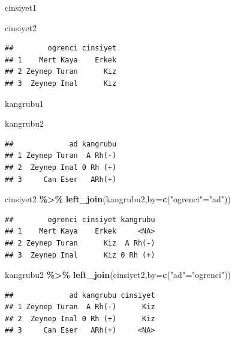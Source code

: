 \documentclass[
  oneside]{book}
\newenvironment{Shaded}{\begin{snugshade}}{\end{snugshade}}
\newcommand{\AttributeTok}[1]{\textcolor[rgb]{0.13,0.29,0.53}{#1}}
\newcommand{\FunctionTok}[1]{\textcolor[rgb]{0.13,0.29,0.53}{\textbf{#1}}}
\newcommand{\NormalTok}[1]{#1}
\newcommand{\OtherTok}[1]{\textcolor[rgb]{0.56,0.35,0.01}{#1}}
\newcommand{\SpecialCharTok}[1]{\textcolor[rgb]{0.81,0.36,0.00}{\textbf{#1}}}
\newcommand{\StringTok}[1]{\textcolor[rgb]{0.31,0.60,0.02}{#1}}
\begin{document}
cinsiyet1

\begin{Shaded}
\begin{Highlighting}[]
\NormalTok{cinsiyet2}
\end{Highlighting}
\end{Shaded}

\begin{verbatim}
##        ogrenci cinsiyet
## 1    Mert Kaya    Erkek
## 2 Zeynep Turan      Kiz
## 3  Zeynep Inal      Kiz
\end{verbatim}

kangrubu1

\begin{Shaded}
\begin{Highlighting}[]
\NormalTok{kangrubu2}
\end{Highlighting}
\end{Shaded}

\begin{verbatim}
##             ad kangrubu
## 1 Zeynep Turan  A Rh(-)
## 2  Zeynep Inal 0 Rh (+)
## 3     Can Eser   ARh(+)
\end{verbatim}

\begin{Shaded}
\begin{Highlighting}[]
\NormalTok{cinsiyet2 }\SpecialCharTok{\%\textgreater{}\%} 
\FunctionTok{left\_join}\NormalTok{(kangrubu2,}\AttributeTok{by=}\FunctionTok{c}\NormalTok{(}\StringTok{"ogrenci"}\OtherTok{=}\StringTok{"ad"}\NormalTok{))}
\end{Highlighting}
\end{Shaded}

\begin{verbatim}
##        ogrenci cinsiyet kangrubu
## 1    Mert Kaya    Erkek     <NA>
## 2 Zeynep Turan      Kiz  A Rh(-)
## 3  Zeynep Inal      Kiz 0 Rh (+)
\end{verbatim}

\begin{Shaded}
\begin{Highlighting}[]
\NormalTok{kangrubu2 }\SpecialCharTok{\%\textgreater{}\%} 
\FunctionTok{left\_join}\NormalTok{(cinsiyet2,}\AttributeTok{by=}\FunctionTok{c}\NormalTok{(}\StringTok{"ad"}\OtherTok{=}\StringTok{"ogrenci"}\NormalTok{))}
\end{Highlighting}
\end{Shaded}

\begin{verbatim}
##             ad kangrubu cinsiyet
## 1 Zeynep Turan  A Rh(-)      Kiz
## 2  Zeynep Inal 0 Rh (+)      Kiz
## 3     Can Eser   ARh(+)     <NA>
\end{verbatim}
\end{document}
